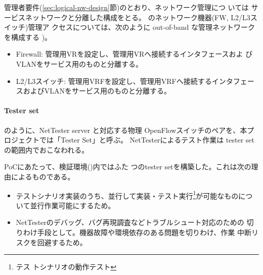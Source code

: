 管理者要件(\ref{sec:logical-nw-design}節)のとおり、ネットワーク管理につ
いては \yo サービスネットワークと分離した構成をとる。
のネットワーク機器(FW, L2/L3スイッチ)管理ア
クセスについては、次のように out-of-band な管理ネットワークを構成する
)。
\begin{itemize}
 \item Firewall: 管理用VRを設定し、管理用VRへ接続するインタフェースおよ
       びVLANをサービス用のものと分離する。
 \item L2/L3スイッチ: 管理用VRFを設定し、管理用VRFへ接続するインタフェー
       スおよびVLANをサービス用のものと分離する。
\end{itemize}

    \paragraph{Tester set}
のように、NetTester server と対応する物理
OpenFlowスイッチのペアを、本プロジェクトでは「Tester Set」と呼ぶ。
NetTesterによるテスト作業は tester set の範囲内でおこなわれる。

PoCにあたって、検証環境()内ではふた
つのtester setを構築した。これは次の理由によるものである。
\begin{itemize}
 \item テストシナリオ実装のうち、並行して実装・テスト実行\footnote{テス
       トシナリオの動作テスト}が可能なものについて並行作業可能にするため。
 \item NetTesterのデバッグ、バグ再現調査などトラブルシュート対応のための
       切りわけ手段として。機器故障や環境依存のある問題を切りわけ、作業
       中断リスクを回避するため。
\end{itemize}


